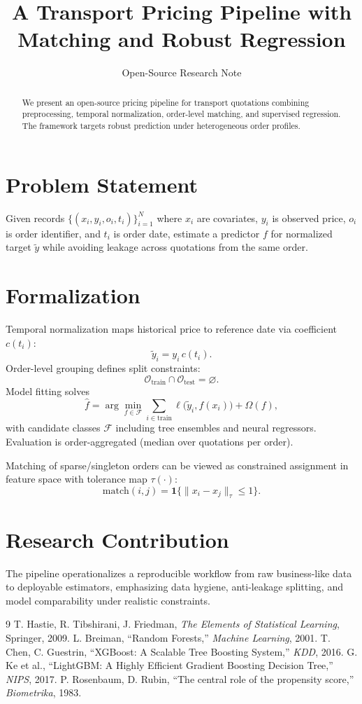 ﻿\documentclass[11pt,a4paper]{article}
\title{A Transport Pricing Pipeline with Matching and Robust Regression}
\author{Open-Source Research Note}
\date{}
\begin{document}
\maketitle

\begin{abstract}
We present an open-source pricing pipeline for transport quotations combining preprocessing, temporal normalization, order-level matching, and supervised regression. The framework targets robust prediction under heterogeneous order profiles.
\end{abstract}

\section{Problem Statement}
Given records $\{(x_i,y_i,o_i,t_i)\}_{i=1}^N$ where $x_i$ are covariates, $y_i$ is observed price, $o_i$ is order identifier, and $t_i$ is order date, estimate a predictor $f$ for normalized target $\tilde{y}$ while avoiding leakage across quotations from the same order.

\section{Formalization}
Temporal normalization maps historical price to reference date via coefficient $c(t_i)$:
\[
\tilde{y}_i = y_i\,c(t_i).
\]
Order-level grouping defines split constraints:
\[
\mathcal{O}_{\mathrm{train}}\cap\mathcal{O}_{\mathrm{test}}=\varnothing.
\]
Model fitting solves
\[
\hat{f}=\arg\min_{f\in\mathcal{F}}\sum_{i\in\mathrm{train}}\ell\big(\tilde{y}_i,f(x_i)\big)+\Omega(f),
\]
with candidate classes $\mathcal{F}$ including tree ensembles and neural regressors. Evaluation is order-aggregated (median over quotations per order).

Matching of sparse/singleton orders can be viewed as constrained assignment in feature space with tolerance map $\tau(\cdot)$:
\[
\mathrm{match}(i,j)=\mathbf{1}\{\|x_i-x_j\|_{\tau}\le 1\}.
\]

\section{Research Contribution}
The pipeline operationalizes a reproducible workflow from raw business-like data to deployable estimators, emphasizing data hygiene, anti-leakage splitting, and model comparability under realistic constraints.

\begin{thebibliography}{9}
 T. Hastie, R. Tibshirani, J. Friedman, \emph{The Elements of Statistical Learning}, Springer, 2009.
 L. Breiman, ``Random Forests,'' \emph{Machine Learning}, 2001.
 T. Chen, C. Guestrin, ``XGBoost: A Scalable Tree Boosting System,'' \emph{KDD}, 2016.
 G. Ke et al., ``LightGBM: A Highly Efficient Gradient Boosting Decision Tree,'' \emph{NIPS}, 2017.
 P. Rosenbaum, D. Rubin, ``The central role of the propensity score,'' \emph{Biometrika}, 1983.
\end{thebibliography}
\end{document}
